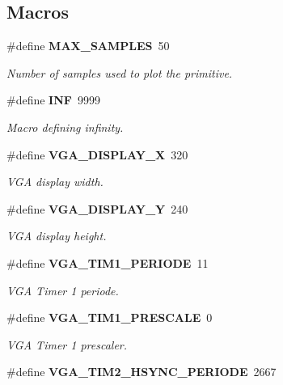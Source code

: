 \subsection*{Macros}
\begin{DoxyCompactItemize}
\item 
\#define {\bf M\+A\+X\+\_\+\+S\+A\+M\+P\+L\+ES}~50\label{system_8h_a78f316da3a87bf72cb1647786b64bf0e}

\begin{DoxyCompactList}\small\item\em Number of samples used to plot the primitive. \end{DoxyCompactList}\item 
\#define {\bf I\+NF}~9999\label{system_8h_a12c2040f25d8e3a7b9e1c2024c618cb6}

\begin{DoxyCompactList}\small\item\em Macro defining infinity. \end{DoxyCompactList}\item 
\#define {\bf V\+G\+A\+\_\+\+D\+I\+S\+P\+L\+A\+Y\+\_\+X}~320\label{system_8h_ace7f348dc91111917772d3e19f8821d3}

\begin{DoxyCompactList}\small\item\em V\+GA display width. \end{DoxyCompactList}\item 
\#define {\bf V\+G\+A\+\_\+\+D\+I\+S\+P\+L\+A\+Y\+\_\+Y}~240\label{system_8h_a9c3e46882b624fe1887d0ec6171d771b}

\begin{DoxyCompactList}\small\item\em V\+GA display height. \end{DoxyCompactList}\item 
\#define {\bf V\+G\+A\+\_\+\+T\+I\+M1\+\_\+\+P\+E\+R\+I\+O\+DE}~11\label{system_8h_a9934465d996215f7e3a39f574116cd16}

\begin{DoxyCompactList}\small\item\em V\+GA Timer 1 periode. \end{DoxyCompactList}\item 
\#define {\bf V\+G\+A\+\_\+\+T\+I\+M1\+\_\+\+P\+R\+E\+S\+C\+A\+LE}~0\label{system_8h_ab20ff576649ab2c78f0f87b758c2705b}

\begin{DoxyCompactList}\small\item\em V\+GA Timer 1 prescaler. \end{DoxyCompactList}\item 
\#define {\bf V\+G\+A\+\_\+\+T\+I\+M2\+\_\+\+H\+S\+Y\+N\+C\+\_\+\+P\+E\+R\+I\+O\+DE}~2667\label{system_8h_a6781ff356015bb423813eb349582faa3}


\end{DoxyCompactItemize}
